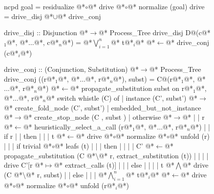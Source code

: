 \documentclass[12pt,a4paper]{report}
\begin{document}
\thispagestyle{empty}
\begin{figure}[h]
\begin{PseudoCode}[moredelim={[is][stringstyle]{@@}{@@}},
  moredelim={[is][\color{dkgreen}\bfseries]{@!}{@!}},
  moredelim={[is][\color{red}\bfseries]{!!}{!!}}]
ncpd goal = residualize @*$\circ$@* drive @*$\circ$@* normalize (goal)
drive     = drive_disj @*$\cup$@* drive_conj

drive_disj :: Disjunction @*$\to$@* Process_Tree
drive_disj D@(c@*$_1$@*, @*$\dots$@*, c@*$_n$@*) =
  @*$\bigvee_{i=1}^n$@* t@*$_i$@* @*$\leftarrow$@* drive_conj (c@*$_i$@*)

drive_conj :: (Conjunction, Substitution) @*$\to$@* Process_Tree
drive_conj ((r@*$_1$@*, @*$\dots$@*, r@*$_n$@*), subst) =
  C@(r@*$_1$@*, @*$\dots$@*, r@*$_n$@*) @*$\leftarrow$@* propagate_substitution subst on r@*$_1$@*, @*$\dots$@*, r@*$_n$@*
  switch whistle (C) of
  | instance (C', subst')      @*$\to$@* create_fold_node (C', subst')
  | embedded_but_not_instance @*$\to$@* create_stop_node (C , subst )
  | otherwise @*$\to$@*
  | | r @*$\leftarrow$@* heuristically_select_a_call (r@*$_1$@*, @*$\dots$@*, r@*$_n$@*)
  | | if r
  | | then
  | | | t @*$\leftarrow$@* drive @*$\circ$@* normalize @*$\circ$@* unfold (r)
  | | | if trivial @*$\circ$@* leafs (t)
  | | | then
  | | | | C' @*$\leftarrow$@* propagate_substitution (C @*$\setminus$@* r, extract_substitution (t))
  | | | | drive C'[r @*$\mapsto$@* extract_calls (t)]
  | | | else
  | | | | t @*$\bigwedge$@* drive (C @*$\setminus$@* r, subst)
  | | else
  | | | @*$\bigwedge_{i=1}^n$@* t@*$_i$@* @*$\leftarrow$@* drive @*$\circ$@* normalize @*$\circ$@* unfold (r@*$_i$@*)
\end{PseudoCode}
\end{figure}
\end{document}
